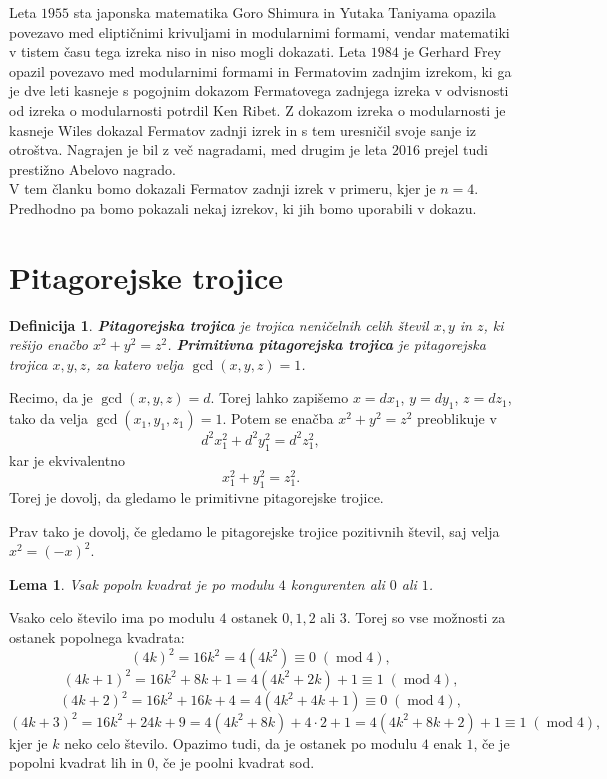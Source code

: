 \documentclass[12pt, a4paper]{article}
\newtheorem{lema}{Lema}
\newtheorem{definicija}{Definicija}
\renewcommand{\mod}{\operatorname{mod}}
\begin{document}
Leta $1955$ sta japonska matematika Goro Shimura in Yutaka Taniyama opazila povezavo med eliptičnimi krivuljami in modularnimi formami, vendar matematiki v tistem času tega izreka niso in niso mogli dokazati. Leta $1984$ je Gerhard Frey opazil povezavo med modularnimi formami in Fermatovim zadnjim izrekom, ki ga je dve leti kasneje s pogojnim dokazom Fermatovega zadnjega izreka v odvisnosti od izreka o modularnosti potrdil Ken Ribet. Z dokazom izreka o modularnosti je kasneje Wiles dokazal Fermatov zadnji izrek in s tem uresničil svoje sanje iz otroštva. Nagrajen je bil z več nagradami, med drugim je leta $2016$ prejel tudi prestižno Abelovo nagrado. 
\\

V tem članku bomo dokazali Fermatov zadnji izrek v primeru, kjer je  $n=4$. Predhodno pa bomo pokazali nekaj izrekov, ki jih bomo uporabili v dokazu.


\section{Pitagorejske trojice}



\begin{definicija}
\textbf{Pitagorejska trojica} je trojica neničelnih celih števil $x, y$ in $z$, ki rešijo enačbo $x^2+y^2=z^2$. 
\textbf{Primitivna pitagorejska trojica} je pitagorejska trojica $x, y, z$, za katero velja $\gcd (x, y, z)=1$. 
\end{definicija}

Recimo, da je $\gcd (x, y, z)=d$. Torej lahko zapišemo $x=dx_1$, $y=dy_1$, $z=dz_1$, tako da velja $\gcd (x_1, y_1, z_1)=1$. Potem se enačba $x^2 + y^2 = z^2$ preoblikuje v $$d^2x_1^2+d^2y_1^2=d^2z_1^2,$$ kar je ekvivalentno  $$x_1^2+y_1^2=z_1^2.$$ Torej je dovolj, da gledamo le primitivne pitagorejske trojice.

Prav tako je dovolj, če gledamo le pitagorejske trojice pozitivnih števil, saj velja $x^2 = (-x)^2$.

\begin{lema}\label{ostanki mod 4}
Vsak popoln kvadrat je po modulu $4$ kongurenten ali $0$ ali $1$.
\end{lema}
\proof
Vsako celo število ima po modulu $4$ ostanek $0, 1, 2$ ali $3$. Torej so vse možnosti za ostanek popolnega kvadrata:
$$(4k)^2 = 16k^2 = 4(4k^2) \equiv 0\;   (\mod 4),$$
$$(4k+1)^2 = 16k^2  + 8k + 1 = 4(4k^2 + 2k) +1 \equiv 1 \; (\mod 4),$$
$$(4k+2)^2 = 16k^2 + 16k + 4 = 4(4k^2 + 4k + 1) \equiv 0 \; (\mod 4),$$
$$(4k+3)^2 = 16k^2 + 24k + 9 = 4(4k^2 + 8k) + 4 \cdot 2 +1 = 4(4k^2 + 8k + 2) + 1 \equiv 1 \; (\mod 4),$$
kjer je $k$ neko celo število.
Opazimo tudi, da je ostanek po modulu $4$ enak $1$, če je popolni kvadrat lih in $0$, če je poolni kvadrat sod.
\endproof
\end{document}
